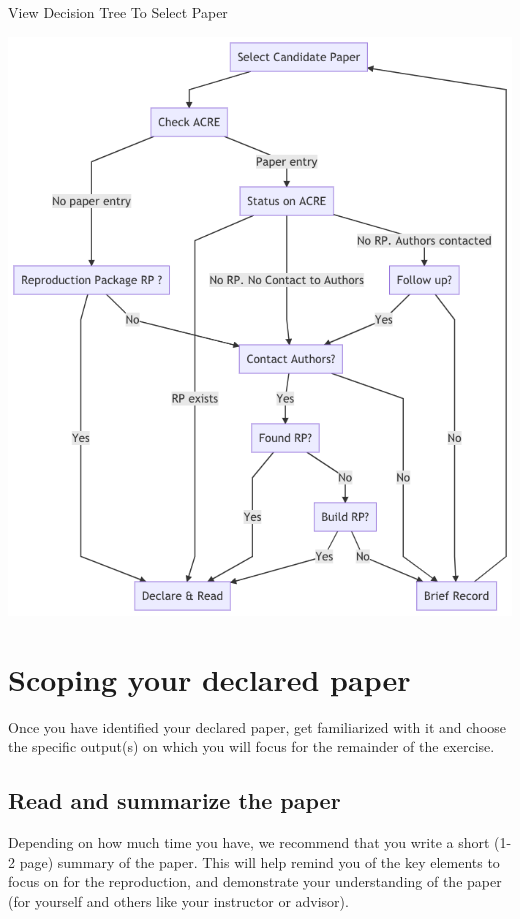 \documentclass[]{book}
\begin{document}
View Decision Tree To Select Paper

\includegraphics{candidate-to-declared-paper.png}

\hypertarget{scoping-your-declared-paper}{%
\section{Scoping your declared paper}\label{scoping-your-declared-paper}}

Once you have identified your declared paper, get familiarized with it and choose the specific output(s) on which you will focus for the remainder of the exercise.

\hypertarget{read-sum}{%
\subsection{Read and summarize the paper}\label{read-sum}}

Depending on how much time you have, we recommend that you write a short (1-2 page) summary of the paper. This will help remind you of the key elements to focus on for the reproduction, and demonstrate your understanding of the paper (for yourself and others like your instructor or advisor).
\end{document}
